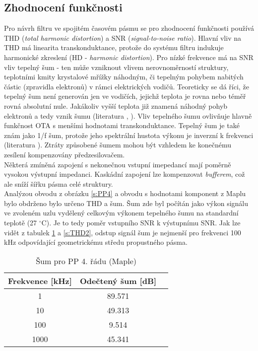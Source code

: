 \subsection{Zhodnocení funkčnosti}
\noindent Pro návrh filtru ve spojitém časovém  pásmu se pro zhodnocení funkčnosti používá THD (\textit{total harmonic distortion}) a SNR (\textit{signal-to-noise ratio}). Hlavní vliv na THD má linearita transkonduktance, protože do systému filtru indukuje harmonické zkreslení (HD - \textit{harmonic distortion}). Pro nízké frekvence má na SNR vliv tepelný šum - ten může vzniknout vlivem nerovnoměrností struktury, teplotními kmity krystalové mřížky náhodným, či tepelným pohybem nabitých částic (zpravidla elektronů) v rámci elektrických vodičů. Teoreticky se dá říci, že tepelný šum není generován jen ve vodičích, jejichž teplota je rovna nebo téměř rovná absolutní nule. Jakákoliv vyšší teplota již znamená náhodný pohyb elektronů a tedy vznik šumu (literatura \cite{20}, \cite{21}). Vliv tepelného šumu ovlivňuje hlavně funkčnost OTA s menšími hodnotami transkonduktance. Tepelný šum je také znám jako 1/f šum, protože jeho spektrální hustota výkonu je inverzní k frekvenci (literatura \cite{2}). Ztráty způsobené šumem mohou být vzhledem ke konečnému zesílení kompenzovány předzesilovačem. \\
Některá zmíněná zapojení s nekonečnou vstupní imepedancí mají poměrně vysokou výstupní impedanci. Kaskádní zapojení lze kompenzovat  \textit{bufferem}, což ale sníží šířku pásma celé struktury.\\
Analýzou obvodu z obrázku \ref{s:PP4} a obvodu s hodnotami komponent z Maplu bylo obdrženo bylo určeno THD a šum. Šum zde byl počítán jako výkon signálu ve zvoleném uzlu vydělený celkovým výkonem tepelného šumu na standardní teplotě (27 $^{\circ}$C). Je to tedy poměr vstupního SNR k výstupnímu SNR. Jak lze vidět z tabulek \ref{s:THD1} a \ref{s:THD2}, odstup signál šum je nejmenší pro frekvenci 100 kHz odpovídající geometrickému středu propustného pásma.
\begin{table}[h]
\centering
  \begin{tabular}{ | c | c | c |}
    \hline
     Frekvence [kHz] & Odečtený šum [dB] \\ \hline
    1 & 89.571 \\ \hline
    10 & 49.313 \\ \hline
    100 & 9.514 \\ \hline
    1000 & 45.341 \\ \hline
  \end{tabular}
  \caption[Šum pro PP 4. řádu (Maple)]{Šum pro PP 4. řádu (Maple) \label{s:THD1}}
\end{table}

